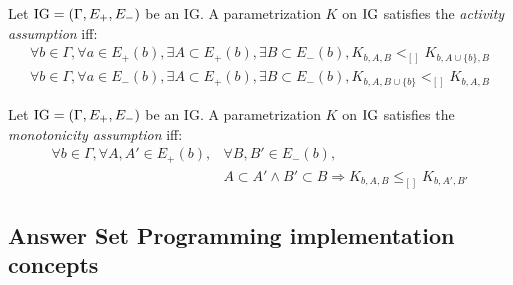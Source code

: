\begin{property}
\label{prop:param_enum_activity}
Let $\mathrm{IG} = (\Gamma, E_+, E_-)$ be an IG. A parametrization $K$ on $\mathrm{IG}$ satisfies the \emph{activity assumption} iff:
\begin{align*}
  \forall b \in \Gamma, \forall a \in E_+(b), \exists A \subset E_+(b), \exists B \subset E_-(b),
    K_{b,A,B} <_{[]} K_{b,A \cup \{b\},B}
\\
  \forall b \in \Gamma, \forall a \in E_-(b), \exists A \subset E_+(b), \exists B \subset E_-(b),
    K_{b,A,B \cup \{b\}} <_{[]} K_{b,A,B}
\end{align*}
\end{property}

\begin{property}
\label{prop:param_enum_monotonicity}
Let $\mathrm{IG} = (\Gamma, E_+, E_-)$ be an IG. A parametrization $K$ on $\mathrm{IG}$ satisfies the \emph{monotonicity assumption} iff:
\begin{align*}
  \forall b \in \Gamma, \forall A, A' \in E_+(b), &\forall B, B' \in E_-(b),
\\
  &A \subset A' \wedge B' \subset B \Rightarrow K_{b,A,B} \leq_{[]} K_{b,A',B'}
\end{align*}
\end{property}

\begin{comment}
\begin{definition}[Admissible parametrization \& Admissible parametrization with respect to inferred parameters]
\label{def:param_enum_inf}
Let $\PH = (\PHs, \PHl, \PHh)$ be a PH so that IG inference is possible, and $\IG = (\Gamma, E_+,
E_-)$ the inferred IG.
A parametrization $K$ on $\IG$ is said to be \emph{admissible} iff it respects
the extreme values assumption, the activity assumption and the monotonicity assumption.
A parametrization $K$ on $\IG$ is said to be \emph{admissible with respect to the
inferred parameters} iff it is admissible and that all parameters that can be inferred regarding
\pref{pps:param_K} are equal to their inferred value.
\end{definition}

\todo{utilité de “Admissible parametrization” seul ?}
\end{comment}


\subsection{Answer Set Programming implementation concepts}

